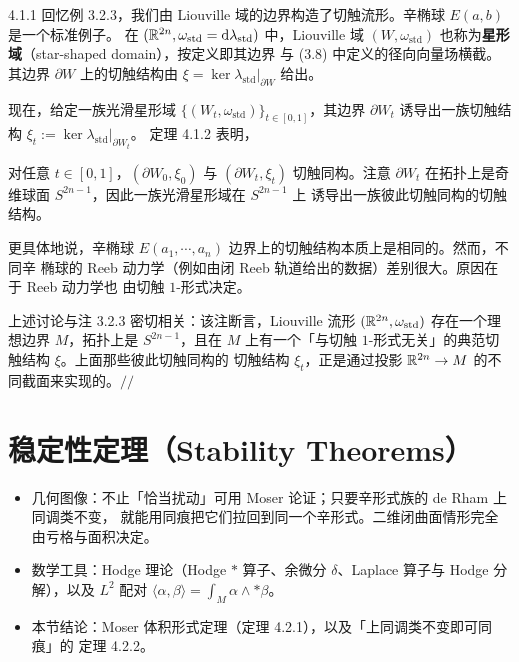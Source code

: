 
\begin{wexam}{4.1.1}
  回忆例 3.2.3，我们由 Liouville 域的边界构造了切触流形。辛椭球 $E(a,b)$ 是一个标准例子。
  在 $(\mathbb{R}^{2n},\omega_{\mathrm{std}}=\mathrm{d}\lambda_{\mathrm{std}})$ 中，Liouville 域
  $(W,\omega_{\mathrm{std}})$ 也称为\textbf{星形域}（star-shaped domain），按定义即其边界
  与 (3.8) 中定义的径向向量场横截。其边界 $\partial W$ 上的切触结构由
  $\xi=\ker\lambda_{\mathrm{std}}|_{\partial W}$ 给出。

  现在，给定一族光滑星形域 $\{(W_t,\omega_{\mathrm{std}})\}_{t\in[0,1]}$，其边界
  $\partial W_t$ 诱导出一族切触结构 $\xi_t:=\ker\lambda_{\mathrm{std}}|_{\partial W_t}$。
  定理 4.1.2 表明，

  对任意 $t\in[0,1]$，$(\partial W_0,\xi_0)$ 与 $(\partial W_t,\xi_t)$ 切触同构。注意
  $\partial W_t$ 在拓扑上是奇维球面 $S^{2n-1}$，因此一族光滑星形域在 $S^{2n-1}$ 上
  诱导出一族彼此切触同构的切触结构。

  更具体地说，辛椭球 $E(a_1,\cdots,a_n)$ 边界上的切触结构本质上是相同的。然而，不同辛
  椭球的 Reeb 动力学（例如由闭 Reeb 轨道给出的数据）差别很大。原因在于 Reeb 动力学也
  由切触 $1$-形式决定。

  上述讨论与注 3.2.3 密切相关：该注断言，Liouville 流形
  $(\mathbb{R}^{2n},\omega_{\mathrm{std}})$ 存在一个理想边界 $M$，拓扑上是 $S^{2n-1}$，且在
  $M$ 上有一个「与切触 $1$-形式无关」的典范切触结构 $\xi$。上面那些彼此切触同构的
  切触结构 $\xi_t$，正是通过投影 $\mathbb{R}^{2n}\to M$ 的不同截面来实现的。\hfill$//$
\end{wexam}

\section{稳定性定理（Stability Theorems）}

\begin{keytakeaways}
\begin{itemize}
  \item 几何图像：不止「恰当扰动」可用 Moser 论证；只要辛形式族的 de Rham 上同调类不变，
        就能用同痕把它们拉回到同一个辛形式。二维闭曲面情形完全由亏格与面积决定。
  \item 数学工具：Hodge 理论（Hodge $\ast$ 算子、余微分 $\delta$、Laplace 算子与 Hodge
        分解），以及 $L^2$ 配对
        $\langle\alpha,\beta\rangle=\int_M\alpha\wedge\ast\beta$。
  \item 本节结论：Moser 体积形式定理（定理 4.2.1），以及「上同调类不变即可同痕」的
        定理 4.2.2。
\end{itemize}
\end{keytakeaways}

